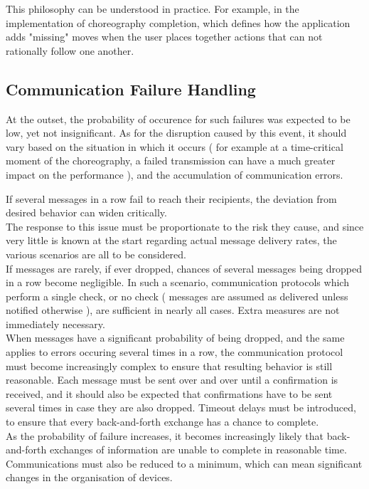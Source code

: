 This philosophy can be understood in practice. For example, in the implementation of choreography completion, which defines how the application adds "missing" moves when the user places together actions that can not rationally follow one another.



\subsection{Communication Failure Handling}

At the outset, the probability of occurence for such failures was expected to be low, yet not insignificant. As for the disruption caused by this event, it should vary based on the situation in which it occurs ( for example at a time-critical moment of the choreography, a failed transmission can have a much greater impact on the performance ), and the accumulation of communication errors.

If several messages in a row fail to reach their recipients, the deviation from desired behavior can widen critically.\\

The response to this issue must be proportionate to the risk they cause, and since very little is known at the start regarding actual message delivery rates, the various scenarios are all to be considered.\\

If messages are rarely, if ever dropped, chances of several messages being dropped in a row become negligible. In such a scenario, communication protocols which perform a single check, or no check ( messages are assumed as delivered unless notified otherwise ), are sufficient in nearly all cases. Extra measures are not immediately necessary.\\

When messages have a significant probability of being dropped, and the same applies to errors occuring several times in a row, the communication protocol must become increasingly complex to ensure that resulting behavior is still reasonable. Each message must be sent over and over until a confirmation is received, and it should also be expected that confirmations have to be sent several times in case they are also dropped. Timeout delays must be introduced, to ensure that every back-and-forth exchange has a chance to complete.\\

As the probability of failure increases, it becomes increasingly likely that back-and-forth exchanges of information are unable to complete in reasonable time. Communications must also be reduced to a minimum, which can mean significant changes in the organisation of devices.\\

